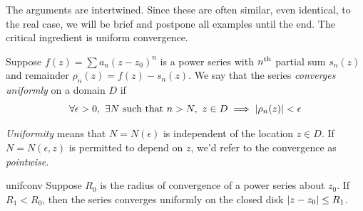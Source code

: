 The arguments are intertwined. Since these are often similar, even identical, to the real case, we will be brief and postpone all examples until the end. The critical ingredient is uniform convergence.

\begin{defn}{}{}
Suppose $f(z)=\sum a_n(z-z_0)^n$ is a power series with $n\textsuperscript{th}$ partial sum $s_n(z)$ and remainder $\rho_n(z) = f(z) - s_n(z)$. We say that the series \emph{converges uniformly} on a domain $D$ if
\[\forall\epsilon>0,\ \exists N\text{ such that }n>N,\ z\in D\implies \left| \rho_n(z)\right|<\epsilon\]
\end{defn}

\emph{Uniformity} means that $N=N(\epsilon)$ is independent of the location $z\in D$. If $N=N(\epsilon,z)$ is permitted to depend on $z$, we'd refer to the convergence as \emph{pointwise.}

\begin{thm}{}{unifconv}
Suppose $R_0$ is the radius of convergence of a power series about $z_0$. If $R_1<R_0$, then the series converges uniformly on the closed disk $\left| z-z_0\right|\le R_1$.
\end{thm}

